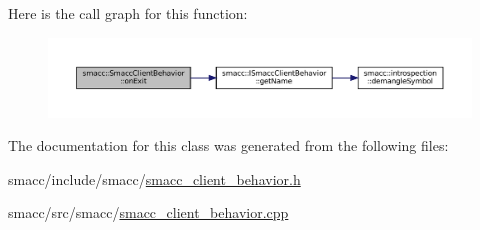 Here is the call graph for this function\+:
\nopagebreak
\begin{figure}[H]
\begin{center}
\leavevmode
\includegraphics[width=350pt]{classsmacc_1_1SmaccClientBehavior_a7e4fb6ce81ff96dc172425852d69c0c5_cgraph}
\end{center}
\end{figure}


The documentation for this class was generated from the following files\+:\begin{DoxyCompactItemize}
\item 
smacc/include/smacc/\hyperlink{smacc__client__behavior_8h}{smacc\+\_\+client\+\_\+behavior.\+h}\item 
smacc/src/smacc/\hyperlink{smacc__client__behavior_8cpp}{smacc\+\_\+client\+\_\+behavior.\+cpp}\end{DoxyCompactItemize}
